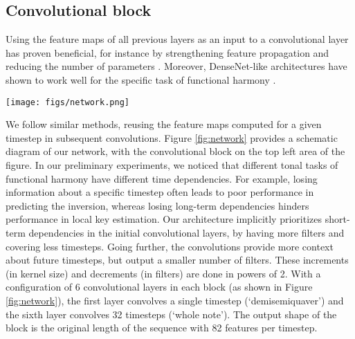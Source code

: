 \documentclass{article}
\newcommand{\guide}[1]{}
\begin{document}
\subsection{Convolutional block}

\guide{Micchi and DenseNet-like convolutions.}
Using the feature maps of all previous layers as an input to a convolutional layer has proven beneficial, for instance by strengthening feature propagation and reducing the number of parameters \cite{huang2017densely}. 
Moreover, DenseNet-like architectures have shown to work well for the specific task of functional harmony \cite{micchi2020not}.

\begin{figure*}
 \centerline{
 \texttt{[image: figs/network.png]}}
 \caption{\emph{AugmentedNet}. The bass and chroma inputs are processed through independent convolutional blocks and then concatenated. Both convolutional blocks are identical and expanded on the top of the figure. A convolutional block has six 1D convolutional layers. Each layer doubles the kernel size (number of timesteps covered) and halves the number of output filters, prioritizing short-term dependencies but providing long-term context that benefits the subsequent GRU layers.}
 \label{fig:network}
\end{figure*}

\guide{Convolutional layers.}
We follow similar methods, reusing the feature maps computed for a given timestep in subsequent convolutions. 
Figure \ref{fig:network} provides a schematic diagram of our network, with the convolutional block on the top left area of the figure. 
In our preliminary experiments, we noticed that different tonal tasks of functional harmony have different time dependencies. 
For example, losing information about a specific timestep often leads to poor performance in predicting the inversion, whereas losing long-term dependencies hinders performance in local key estimation. 
Our architecture implicitly prioritizes short-term dependencies in the initial convolutional layers, by having more filters and covering less timesteps. Going further, the convolutions provide more context about future timesteps, but output a smaller number of filters. These increments (in kernel size) and decrements (in filters) are done in powers of 2. With a configuration of 6 convolutional layers in each block (as shown in Figure \ref{fig:network}), the first layer convolves a single timestep (`demisemiquaver') and the sixth layer convolves 32 timesteps (`whole note'). The output shape of the block is the original length of the sequence with 82 features per timestep.
\end{document}
